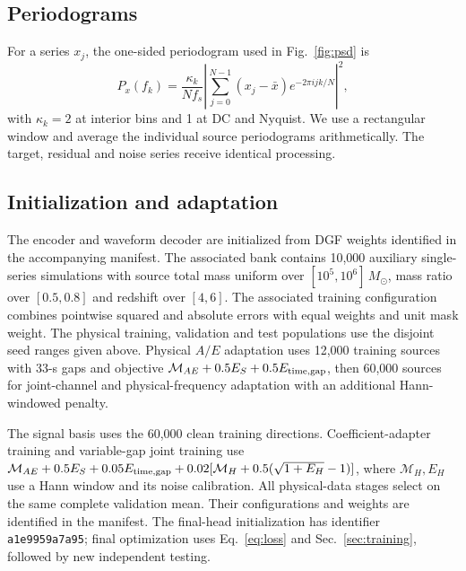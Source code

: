 \documentclass[10pt,prd,aps,a4paper,twocolumn,superscriptaddress,nofootinbib,floatfix]{revtex4-2}
\begin{document}
\subsection{Periodograms}
For a series $x_j$, the one-sided periodogram used in Fig.~\ref{fig:psd} is
\begin{equation}
P_x(f_k)=\frac{\kappa_k}{Nf_s}\left|\sum_{j=0}^{N-1}(x_j-\bar x)e^{-2\pi i jk/N}\right|^2,
\end{equation}
with $\kappa_k=2$ at interior bins and 1 at DC and Nyquist. We use a rectangular window and average the individual source periodograms arithmetically. The target, residual and noise series receive identical processing.

\subsection{Initialization and adaptation}\label{app:initialization}
The encoder and waveform decoder are initialized from DGF weights identified in the accompanying manifest. The associated bank contains 10,000 auxiliary single-series simulations with source total mass uniform over $[10^5,10^6]\,M_\odot$, mass ratio over $[0.5,0.8]$ and redshift over $[4,6]$. The associated training configuration combines pointwise squared and absolute errors with equal weights and unit mask weight. The physical training, validation and test populations use the disjoint seed ranges given above. Physical $A/E$ adaptation uses 12,000 training sources with 33-s gaps and objective $\mathcal M_{AE}+0.5E_S+0.5E_{\rm time,gap}$, then 60,000 sources for joint-channel and physical-frequency adaptation with an additional Hann-windowed penalty.

The signal basis uses the 60,000 clean training directions. Coefficient-adapter training and variable-gap joint training use $\mathcal M_{AE}+0.5E_S+0.05E_{\rm time,gap}+0.02[\mathcal M_H+0.5(\sqrt{1+E_H}-1)]$, where $\mathcal M_H,E_H$ use a Hann window and its noise calibration. All physical-data stages select on the same complete validation mean. Their configurations and weights are identified in the manifest. The final-head initialization has identifier \texttt{a1e9959a7a95}; final optimization uses Eq.~\eqref{eq:loss} and Sec.~\ref{sec:training}, followed by new independent testing.
\end{document}
